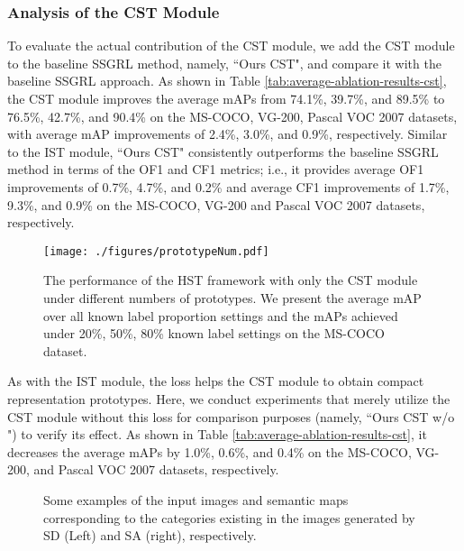 \subsubsection{Analysis of the CST Module}
\label{sec:exp-cst}
To evaluate the actual contribution of the CST module, we add the CST module to the baseline SSGRL method, namely, ``Ours CST", and compare it with the baseline SSGRL approach. As shown in Table \ref{tab:average-ablation-results-cst}, the CST module improves the average mAPs from 74.1\%, 39.7\%, and 89.5\% to 76.5\%, 42.7\%, and 90.4\% on the MS-COCO, VG-200, Pascal VOC 2007 datasets, with average mAP improvements of 2.4\%, 3.0\%, and 0.9\%, respectively. Similar to the IST module, ``Ours CST" consistently outperforms the baseline SSGRL method in terms of the OF1 and CF1 metrics; i.e., it provides average OF1 improvements of 0.7\%, 4.7\%, and 0.2\% and average CF1 improvements of 1.7\%, 9.3\%, and 0.9\% on the MS-COCO, VG-200 and Pascal VOC 2007 datasets, respectively. 

\begin{figure}[!t]
   \centering
   \texttt{[image: ./figures/prototypeNum.pdf]}
   \caption{The performance of the HST framework with only the CST module under different numbers of prototypes. We present the average mAP over all known label proportion settings and the mAPs achieved under 20\%, 50\%, 80\% known label settings on the MS-COCO dataset.}
   \label{fig:prototypenum}
\end{figure}

As with the IST module, the loss  helps the CST module to obtain compact representation prototypes. Here, we conduct experiments that merely utilize the CST module without this loss for comparison purposes (namely, ``Ours CST w/o ") to verify its effect. As shown in Table \ref{tab:average-ablation-results-cst}, it decreases the average mAPs by 1.0\%, 0.6\%, and 0.4\% on the MS-COCO, VG-200, and Pascal VOC 2007 datasets, respectively.


\begin{figure*}[!t]
\centering
{}
\vspace{-10pt}
\caption{Some examples of the input images and semantic maps corresponding to the categories existing in the images generated by SD (Left) and SA (right), respectively.}
\label{fig:visualization}
\end{figure*}

